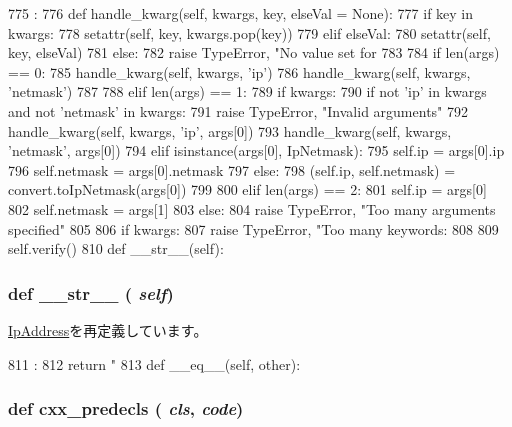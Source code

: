 \begin{DoxyCode}
775                                        :
776         def handle_kwarg(self, kwargs, key, elseVal = None):
777             if key in kwargs:
778                 setattr(self, key, kwargs.pop(key))
779             elif elseVal:
780                 setattr(self, key, elseVal)
781             else:
782                 raise TypeError, "No value set for %
783 
784         if len(args) == 0:
785             handle_kwarg(self, kwargs, 'ip')
786             handle_kwarg(self, kwargs, 'netmask')
787 
788         elif len(args) == 1:
789             if kwargs:
790                 if not 'ip' in kwargs and not 'netmask' in kwargs:
791                     raise TypeError, "Invalid arguments"
792                 handle_kwarg(self, kwargs, 'ip', args[0])
793                 handle_kwarg(self, kwargs, 'netmask', args[0])
794             elif isinstance(args[0], IpNetmask):
795                 self.ip = args[0].ip
796                 self.netmask = args[0].netmask
797             else:
798                 (self.ip, self.netmask) = convert.toIpNetmask(args[0])
799 
800         elif len(args) == 2:
801             self.ip = args[0]
802             self.netmask = args[1]
803         else:
804             raise TypeError, "Too many arguments specified"
805 
806         if kwargs:
807             raise TypeError, "Too many keywords: %
808 
809         self.verify()
810 
    def __str__(self):
\end{DoxyCode}
\hypertarget{classm5_1_1params_1_1IpNetmask_aa7a4b9bc0941308e362738503137460e}{
\subsubsection[{\_\-\_\-str\_\-\_\-}]{\setlength{\rightskip}{0pt plus 5cm}def \_\-\_\-str\_\-\_\- ( {\em self})}}
\label{classm5_1_1params_1_1IpNetmask_aa7a4b9bc0941308e362738503137460e}


\hyperlink{classm5_1_1params_1_1IpAddress_aa7a4b9bc0941308e362738503137460e}{IpAddress}を再定義しています。


\begin{DoxyCode}
811                      :
812         return "%
813 
    def __eq__(self, other):
\end{DoxyCode}
\hypertarget{classm5_1_1params_1_1IpNetmask_a0b408a11a14bd1d770e28f71a6e14ab5}{
\subsubsection[{cxx\_\-predecls}]{\setlength{\rightskip}{0pt plus 5cm}def cxx\_\-predecls ( {\em cls}, \/   {\em code})}}
\label{classm5_1_1params_1_1IpNetmask_a0b408a11a14bd1d770e28f71a6e14ab5}


